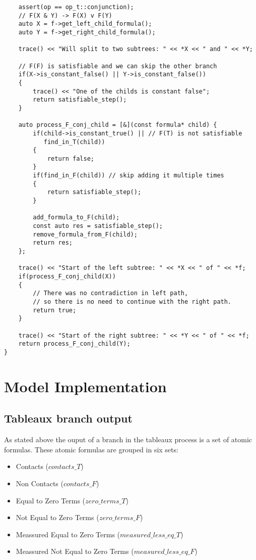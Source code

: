 \documentclass{article}
\begin{document}
\begin{lstlisting}
    assert(op == op_t::conjunction);
    // F(X & Y) -> F(X) v F(Y)
    auto X = f->get_left_child_formula();
    auto Y = f->get_right_child_formula();

    trace() << "Will split to two subtrees: " << *X << " and " << *Y;

    // F(F) is satisfiable and we can skip the other branch
    if(X->is_constant_false() || Y->is_constant_false())
    {
        trace() << "One of the childs is constant false";
        return satisfiable_step();
    }

    auto process_F_conj_child = [&](const formula* child) {
        if(child->is_constant_true() || // F(T) is not satisfiable
           find_in_T(child))
        {
            return false;
        }
        if(find_in_F(child)) // skip adding it multiple times
        {
            return satisfiable_step();
        }

        add_formula_to_F(child);
        const auto res = satisfiable_step();
        remove_formula_from_F(child);
        return res;
    };

    trace() << "Start of the left subtree: " << *X << " of " << *f;
    if(process_F_conj_child(X))
    {
        // There was no contradiction in left path,
        // so there is no need to continue with the right path.
        return true;
    }

    trace() << "Start of the right subtree: " << *Y << " of " << *f;
    return process_F_conj_child(Y);
}
\end{lstlisting}

	\newpage
	\section{Model Implementation}

	\subsection*{Tableaux branch output}
	\label{tableaux:branch:output}
	As stated above the ouput of a branch in the tableaux process is a set of atomic formulas. These atomic formulas are grouped in six sets:
	\begin{itemize}
		\item Contacts ($contacts\_T$)
		\item Non Contacts ($contacts\_F$)
		\item Equal to Zero Terms ($zero\_terms\_T$)
		\item Not Equal to Zero Terms ($zero\_terms\_F$)
		\item Meassured Equal to Zero Terms ($measured\_less\_eq\_T$)
		\item Meassured Not Equal to Zero Terms ($measured\_less\_eq\_F$)
	\end{itemize}
\end{document}

